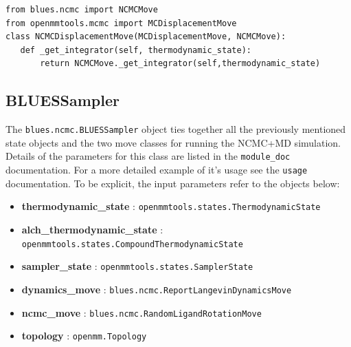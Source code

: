 \begin{verbatim}
from blues.ncmc import NCMCMove
from openmmtools.mcmc import MCDisplacementMove
class NCMCDisplacementMove(MCDisplacementMove, NCMCMove):
   def _get_integrator(self, thermodynamic_state):
       return NCMCMove._get_integrator(self,thermodynamic_state)

\end{verbatim}

\hypertarget{bluessampler}{%
\subsection{BLUESSampler}\label{bluessampler}}

The \texttt{blues.ncmc.BLUESSampler} object ties together all the previously mentioned state objects and the two move classes for running the NCMC+MD simulation.
Details of the parameters for this class are listed in the \texttt{module_doc} documentation.
For a more detailed example of it's usage see the \texttt{usage} documentation.
To be explicit, the input parameters refer to the objects below:

\begin{itemize}
\tightlist
\item
  \textbf{thermodynamic\_state} :
  \texttt{openmmtools.states.ThermodynamicState}
\item
  \textbf{alch\_thermodynamic\_state} :
  \texttt{openmmtools.states.CompoundThermodynamicState}
\item
  \textbf{sampler\_state} : \texttt{openmmtools.states.SamplerState}
\item
  \textbf{dynamics\_move} :
  \texttt{blues.ncmc.ReportLangevinDynamicsMove}
\item
  \textbf{ncmc\_move} : \texttt{blues.ncmc.RandomLigandRotationMove}
\item
  \textbf{topology} : \texttt{openmm.Topology}
\end{itemize}

